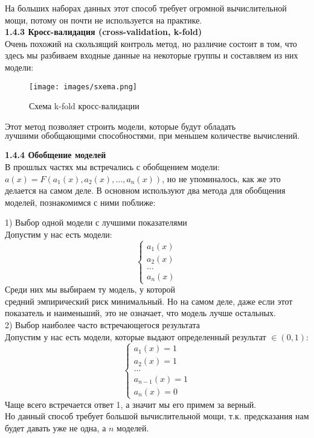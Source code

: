 На больших наборах данных этот способ требует огромной вычислительной мощи,
потому он почти не используется на практике. \\
\vspace{0.5cm}
\textbf{1.4.3 Кросс-валидация (cross-validation, k-fold)} \\
\vspace{0.5cm}
Очень похожий на скользящий контроль метод, но различие состоит в том, что здесь мы разбиваем входные данные
на некоторые группы и составляем из них модели: \\
\begin{figure}[htbp]
    \centering
    \texttt{[image: images/sxema.png]}
    \caption{Схема k-fold кросс-валидации}
    \label{fig:example_kross_validator}
\end{figure}
Этот метод позволяет строить модели, которые будут обладать \(\textbf{лучшими обобщающими способностями,
при меньшем количестве вычислений.}\)

\vspace{0.5cm}
\textbf{1.4.4 Обобщение моделей} \\
\vspace{0.5cm}
В прошлых частях мы встречались с обобщением модели: \(a(x) = F(a_1(x), a_2(x), \ldots, a_n(x))\), но не упоминалось,
как же это делается на самом деле.
В основном используют два метода для обобщения моделей, познакомимся с ними поближе: \\
\vspace{0.5cm}

1) \(\textbf{Выбор одной модели с лучшими показателями}\) \\
\vspace{0.3cm}
Допустим у нас есть модели: \\
\[
    \begin{cases}
    a_1(x) \\
    a_2(x) \\
    \ldots \\
    a_n(x)
    \end{cases}
\]
Среди них мы выбираем ту модель, у которой \(\textbf{средний эмпирический риск минимальный}\).
Но на самом деле, даже если этот показатель и наименьший, это не означает, что модель лучше остальных. \\
\vspace{0.3cm}
2) \(\textbf{Выбор наиболее часто встречающегося результата}\) \\
\vspace{0.3cm}
Допустим у нас есть модели, которые выдают определенный результат \(\in (0, 1)\): \\
\[
    \begin{cases}
    a_1(x) = 1 \\
    a_2(x) = 1 \\
    \ldots \\
    a_{n-1}(x) = 1 \\
    a_n(x) = 0
    \end{cases}
\]
Чаще всего встречается ответ 1, а значит мы его примем за верный. \\
Но данный способ \(\textbf{требует большой вычислительной мощи}\),
т.к. предсказания нам будет давать уже не одна, а \(n\) моделей. \\


